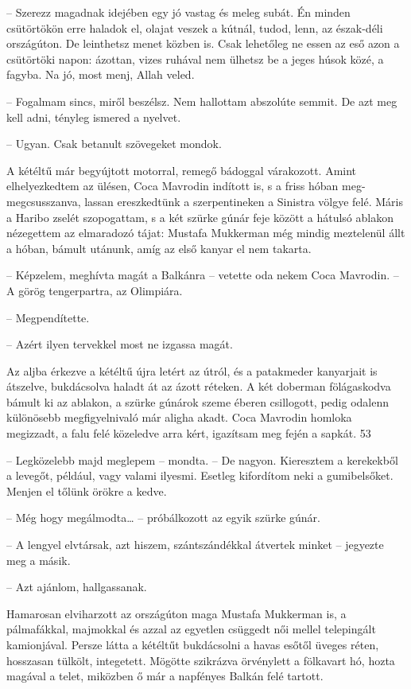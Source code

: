\documentclass{IEEEtran}
\begin{document}
– Szerezz magadnak idejében egy jó vastag és meleg subát. Én minden
csütörtökön erre haladok el, olajat veszek a kútnál, tudod, lenn, az
észak-déli országúton. De leinthetsz menet közben is. Csak lehetőleg ne essen
az eső azon a csütörtöki napon: ázottan, vizes ruhával nem ülhetsz be a jeges
húsok közé, a fagyba. Na jó, most menj, Allah veled.

– Fogalmam sincs, miről beszélsz. Nem hallottam abszolúte semmit. De azt meg
kell adni, tényleg ismered a nyelvet.

– Ugyan. Csak betanult szövegeket mondok.

A kétéltű már begyújtott motorral, remegő bádoggal várakozott. Amint
elhelyezkedtem az ülésen, Coca Mavrodin indított is, s a friss hóban
meg-megcsusszanva, lassan ereszkedtünk a szerpentineken a Sinistra völgye
felé. Máris a Haribo zselét szopogattam, s a két szürke gúnár feje között a
hátulsó ablakon nézegettem az elmaradozó tájat: Mustafa Mukkerman még mindig
meztelenül állt a hóban, bámult utánunk, amíg az első kanyar el nem takarta.

– Képzelem, meghívta magát a Balkánra – vetette oda nekem Coca Mavrodin. – A
görög tengerpartra, az Olimpiára.

– Megpendítette.

– Azért ilyen tervekkel most ne izgassa magát.

Az aljba érkezve a kétéltű újra letért az útról, és a patakmeder kanyarjait is
átszelve, bukdácsolva haladt át az ázott réteken. A két doberman fölágaskodva
bámult ki az ablakon, a szürke gúnárok szeme éberen csillogott, pedig odalenn
különösebb megfigyelnivaló már aligha akadt. Coca Mavrodin homloka megizzadt,
a falu felé közeledve arra kért, igazítsam meg fején a sapkát.
53

– Legközelebb majd meglepem – mondta. – De nagyon. Kieresztem a kerekekből a
levegőt, például, vagy valami ilyesmi. Esetleg kifordítom neki a gumibelsőket.
Menjen el tőlünk örökre a kedve.

– Még hogy megálmodta… – próbálkozott az egyik szürke gúnár.

– A lengyel elvtársak, azt hiszem, szántszándékkal átvertek minket – jegyezte
meg a másik.

– Azt ajánlom, hallgassanak.

Hamarosan elviharzott az országúton maga Mustafa Mukkerman is, a pálmafákkal,
majmokkal és azzal az egyetlen csüggedt női mellel telepingált kamionjával.
Persze látta a kétéltűt bukdácsolni a havas esőtől üveges réten, hosszasan
tülkölt, integetett. Mögötte szikrázva örvénylett a fölkavart hó, hozta
magával a telet, miközben ő már a napfényes Balkán felé tartott.
\end{document}
